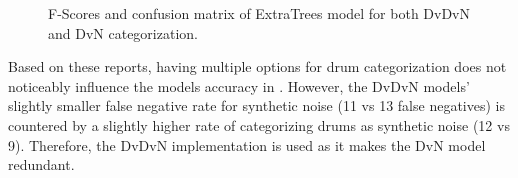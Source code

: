 \documentclass[\main/thesis.tex]{subfiles}
\begin{document}
\begin{figure}[htbp!]
\begin{center}
\end{center}


\caption{F-Scores and confusion matrix of ExtraTrees model for both DvDvN and DvN categorization.}
\label{fig:conf_f1_dvn}
\end{figure}

Based on these reports, having multiple options for drum categorization does not noticeably influence the models accuracy in \decfirst. However, the DvDvN models' slightly smaller false negative rate for synthetic noise (11 vs 13 false negatives) is countered by a slightly higher rate of categorizing drums as synthetic noise (12 vs 9). Therefore, the DvDvN implementation is used as it makes the DvN model redundant.
\end{document}
